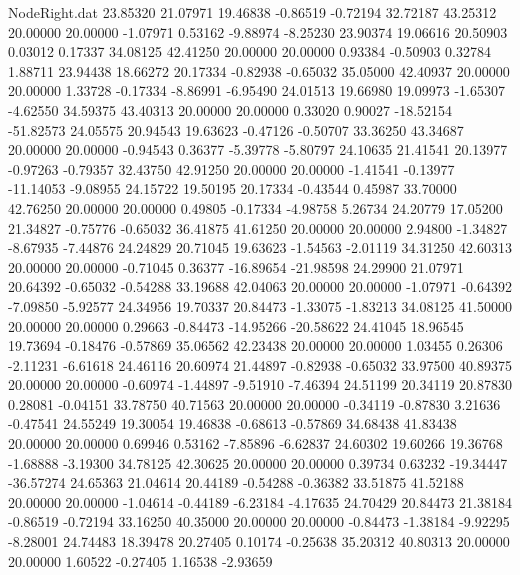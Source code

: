 \begin{filecontents}{NodeRight.dat}
  23.85320   21.07971   19.46838    -0.86519   -0.72194   32.72187   43.25312   20.00000   20.00000   -1.07971    0.53162   -9.88974   -8.25230
  23.90374   19.06616   20.50903     0.03012    0.17337   34.08125   42.41250   20.00000   20.00000    0.93384   -0.50903    0.32784    1.88711
  23.94438   18.66272   20.17334    -0.82938   -0.65032   35.05000   42.40937   20.00000   20.00000    1.33728   -0.17334   -8.86991   -6.95490
  24.01513   19.66980   19.09973    -1.65307   -4.62550   34.59375   43.40313   20.00000   20.00000    0.33020    0.90027  -18.52154  -51.82573
  24.05575   20.94543   19.63623    -0.47126   -0.50707   33.36250   43.34687   20.00000   20.00000   -0.94543    0.36377   -5.39778   -5.80797
  24.10635   21.41541   20.13977    -0.97263   -0.79357   32.43750   42.91250   20.00000   20.00000   -1.41541   -0.13977  -11.14053   -9.08955
  24.15722   19.50195   20.17334    -0.43544    0.45987   33.70000   42.76250   20.00000   20.00000    0.49805   -0.17334   -4.98758    5.26734
  24.20779   17.05200   21.34827    -0.75776   -0.65032   36.41875   41.61250   20.00000   20.00000    2.94800   -1.34827   -8.67935   -7.44876
  24.24829   20.71045   19.63623    -1.54563   -2.01119   34.31250   42.60313   20.00000   20.00000   -0.71045    0.36377  -16.89654  -21.98598
  24.29900   21.07971   20.64392    -0.65032   -0.54288   33.19688   42.04063   20.00000   20.00000   -1.07971   -0.64392   -7.09850   -5.92577
  24.34956   19.70337   20.84473    -1.33075   -1.83213   34.08125   41.50000   20.00000   20.00000    0.29663   -0.84473  -14.95266  -20.58622
  24.41045   18.96545   19.73694    -0.18476   -0.57869   35.06562   42.23438   20.00000   20.00000    1.03455    0.26306   -2.11231   -6.61618
  24.46116   20.60974   21.44897    -0.82938   -0.65032   33.97500   40.89375   20.00000   20.00000   -0.60974   -1.44897   -9.51910   -7.46394
  24.51199   20.34119   20.87830     0.28081   -0.04151   33.78750   40.71563   20.00000   20.00000   -0.34119   -0.87830    3.21636   -0.47541
  24.55249   19.30054   19.46838    -0.68613   -0.57869   34.68438   41.83438   20.00000   20.00000    0.69946    0.53162   -7.85896   -6.62837
  24.60302   19.60266   19.36768    -1.68888   -3.19300   34.78125   42.30625   20.00000   20.00000    0.39734    0.63232  -19.34447  -36.57274
  24.65363   21.04614   20.44189    -0.54288   -0.36382   33.51875   41.52188   20.00000   20.00000   -1.04614   -0.44189   -6.23184   -4.17635
  24.70429   20.84473   21.38184    -0.86519   -0.72194   33.16250   40.35000   20.00000   20.00000   -0.84473   -1.38184   -9.92295   -8.28001
  24.74483   18.39478   20.27405     0.10174   -0.25638   35.20312   40.80313   20.00000   20.00000    1.60522   -0.27405    1.16538   -2.93659

\end{filecontents}

